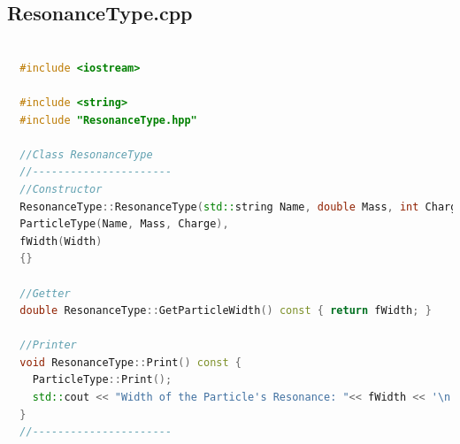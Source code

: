 \documentclass[a4paper, 11pt]{article}
\begin{document}
      \subsection{ResonanceType.cpp}
        \begin{lstlisting}[language=c++, style=code]

  #include <iostream>

  #include <string>
  #include "ResonanceType.hpp"

  //Class ResonanceType
  //----------------------
  //Constructor
  ResonanceType::ResonanceType(std::string Name, double Mass, int Charge, double Width):
  ParticleType(Name, Mass, Charge),
  fWidth(Width)
  {}

  //Getter
  double ResonanceType::GetParticleWidth() const { return fWidth; }

  //Printer
  void ResonanceType::Print() const {
    ParticleType::Print();
    std::cout << "Width of the Particle's Resonance: "<< fWidth << '\n';
  }
  //----------------------
        \end{lstlisting}
\end{document}
